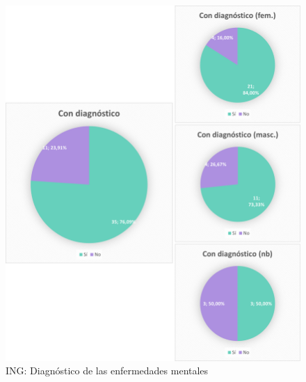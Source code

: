 \documentclass[12pt, a4paper,twoside,titlepage]{book}
\begin{document}
\begin{figure}
    \centering
    \includegraphics[width=1\linewidth]{ANEXO ING/20AnexINGDiag}
    \caption{ING: Diagnóstico de las enfermedades mentales}
    \label{fig:INGDiag}
\end{figure}
\end{document}
